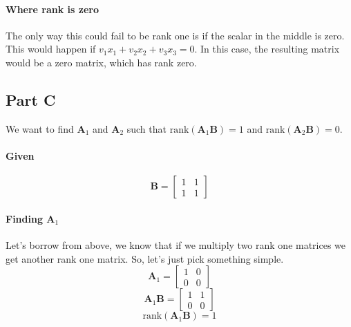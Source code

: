 \documentclass{article}
\begin{document}
            \paragraph{Where rank is zero}
                The only way this could fail to be rank one is if the scalar
                in the middle is zero. This would happen if
                $v_1x_1+v_2x_2+v_3x_3=0$. In this case, the resulting matrix
                would be a zero matrix, which has rank zero.
        \subsection{Part C}
                We want to find $\mathbf{A}_1$ and $\mathbf{A}_2$ such that
                $\text{rank}(\mathbf{A}_1\mathbf{B})=1$ and $\text{rank}(\mathbf{A}_2\mathbf{B})=0$.
                \paragraph{Given}
                    \[
                        \mathbf{B}=\begin{bmatrix}1&1\\1&1\end{bmatrix}
                    \]
                \paragraph{Finding $\mathbf{A}_1$}
                    Let's borrow from above, we know that if we multiply two rank one matrices
                    we get another rank one matrix. So, let's just pick something simple.
                    \[
                        \mathbf{A}_1=\begin{bmatrix}1&0\\0&0\end{bmatrix}
                    \]
                    \[
                        \mathbf{A}_1\mathbf{B}=\begin{bmatrix}1&1\\0&0\end{bmatrix}
                    \]
                    \[
                        \text{rank}(\mathbf{A}_1\mathbf{B})=1
                    \]
\end{document}
